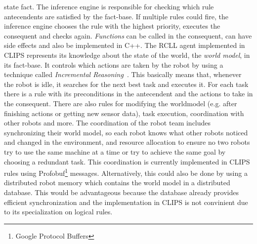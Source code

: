 \documentclass[a4paper,11pt]{article}
\begin{document}
state fact. The inference engine is responsible for checking which
rule antecendents are satisfied by the fact-base. If multiple rules
could fire, the inference engine chooses the rule with the highest
priority, executes the consequent and checks again. \emph{Functions}
can be called in the consequent, can have side effects and also be
implemented in C++. The RCLL agent implemented in CLIPS represents its
knowledge about the state of the world, the \emph{world model}, in its
fact-base. It controls which actions are taken by the robot by using a
technique called \emph{Incremental Reasoning}~\cite{CLIPS-Agent}. This
basically means that, whenever the robot is idle, it searches for the
next best task and executes it. For each task there is a rule with its
preconditions in the antecendent and the actions to take in the
consequent. There are also rules for modifying the worldmodel
(e.g. after finishing actions or getting new sensor data), task
execution, coordination with other robots and more. The coordination
of the robot team includes synchronizing their world model, so each
robot knows what other robots noticed and changed in the environment,
and resource allocation to ensure no two robots try to use the same
machine at a time or try to achieve the same goal by choosing a
redundant task. This coordination is currently implemented in CLIPS
rules using Profobuf\footnote{Google Protocol Buffers}
messages. Alternatively, this could also be done by using a
distributed robot memory which contains the world model in a
distributed database. This would be advantageous
because the database already provides efficient synchronization and
the implementation in CLIPS is not convinient due to its
specialization on logical rules.
\end{document}
